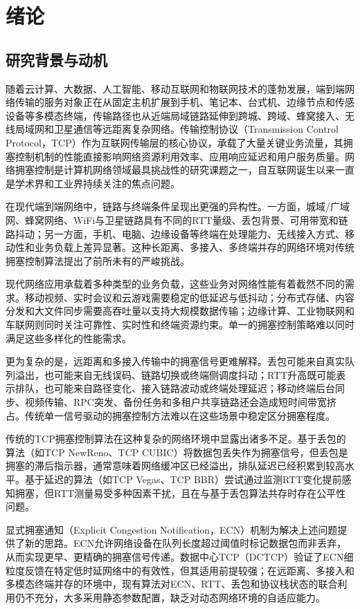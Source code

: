 \chapter{绪论}\label{Chap:chap1}

\section{研究背景与动机}

随着云计算、大数据、人工智能、移动互联网和物联网技术的蓬勃发展，端到端网络传输的服务对象正在从固定主机扩展到手机、笔记本、台式机、边缘节点和传感设备等多模态终端，传输路径也从近端局域链路延伸到跨城、跨域、蜂窝接入、无线局域网和卫星通信等远距离复杂网络。传输控制协议（Transmission Control Protocol，TCP）作为互联网传输层的核心协议，承载了大量关键业务流量，其拥塞控制机制的性能直接影响网络资源利用效率、应用响应延迟和用户服务质量。网络拥塞控制是计算机网络领域最具挑战性的研究课题之一，自互联网诞生以来一直是学术界和工业界持续关注的焦点问题。

在现代端到端网络中，链路与终端条件呈现出更强的异构性。一方面，城域/广域网、蜂窝网络、WiFi与卫星链路具有不同的RTT量级、丢包背景、可用带宽和链路抖动；另一方面，手机、电脑、边缘设备等终端在处理能力、无线接入方式、移动性和业务负载上差异显著。这种长距离、多接入、多终端并存的网络环境对传统拥塞控制算法提出了前所未有的严峻挑战。

现代网络应用承载着多种类型的业务负载，这些业务对网络性能有着截然不同的需求。移动视频、实时会议和云游戏需要稳定的低延迟与低抖动；分布式存储、内容分发和大文件同步需要高吞吐量以支持大规模数据传输；边缘计算、工业物联网和车联网则同时关注可靠性、实时性和终端资源约束。单一的拥塞控制策略难以同时满足这些多样化的性能需求。

更为复杂的是，远距离和多接入传输中的拥塞信号更难解释。丢包可能来自真实队列溢出，也可能来自无线误码、链路切换或终端侧调度抖动；RTT升高既可能表示排队，也可能来自路径变化、接入链路波动或终端处理延迟；移动终端后台同步、视频传输、RPC突发、备份任务和多租户共享链路还会造成短时间带宽挤占。传统单一信号驱动的拥塞控制方法难以在这些场景中稳定区分拥塞程度。

传统的TCP拥塞控制算法在这种复杂的网络环境中显露出诸多不足。基于丢包的算法（如TCP NewReno、TCP CUBIC）将数据包丢失作为拥塞信号，但丢包是拥塞的滞后指示器，通常意味着网络缓冲区已经溢出，排队延迟已经积累到较高水平。基于延迟的算法（如TCP Vegas、TCP BBR）尝试通过监测RTT变化提前感知拥塞，但RTT测量易受多种因素干扰，且在与基于丢包算法共存时存在公平性问题。

显式拥塞通知（Explicit Congestion Notification，ECN）机制为解决上述问题提供了新的思路。ECN允许网络设备在队列长度超过阈值时标记数据包而非丢弃，从而实现更早、更精确的拥塞信号传递。数据中心TCP（DCTCP）验证了ECN细粒度反馈在特定低时延网络中的有效性，但其适用前提较强；在远距离、多接入和多模态终端并存的环境中，现有算法对ECN、RTT、丢包和协议栈状态的联合利用仍不充分，大多采用静态参数配置，缺乏对动态网络环境的自适应能力。


